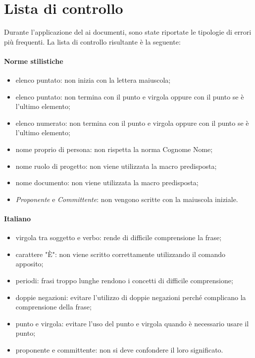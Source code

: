 \documentclass[12pt,a4paper]{article}
\begin{document}
\newpage

\appendix
\section{Lista di controllo}

Durante l’applicazione del  ai documenti, sono state riportate le tipologie di errori più frequenti. La lista di controllo risultante è la seguente:
\paragraph{Norme stilistiche}
\begin{itemize}

	\item elenco puntato: non inizia con la lettera maiuscola;
	\item elenco puntato: non termina con il punto e virgola oppure con il punto se è l’ultimo elemento;
	\item elenco numerato: non termina con il punto e virgola oppure con il punto se è l’ultimo elemento; 
	\item nome proprio di persona: non rispetta la norma Cognome Nome;
	\item nome ruolo di progetto: non viene utilizzata la macro predisposta;
	\item nome documento: non viene utilizzata la macro predisposta;
	\item \textit{Proponente} e \textit{Committente}: non vengono scritte con la maiuscola iniziale. 
\end{itemize}

\paragraph{Italiano}
\begin{itemize}
	\item virgola tra soggetto e verbo: rende di difficile comprensione la frase;
	\item carattere "È": non viene scritto correttamente utilizzando il comando apposito;
	\item periodi: frasi troppo lunghe rendono i concetti di difficile comprensione; 
	\item doppie negazioni: evitare l’utilizzo di doppie negazioni perché complicano la comprensione della frase; 
	\item punto e virgola: evitare l’uso del punto e virgola quando è necessario usare il punto; 
	\item proponente e committente: non si deve confondere il loro significato. 

\end{itemize}
\end{document}
